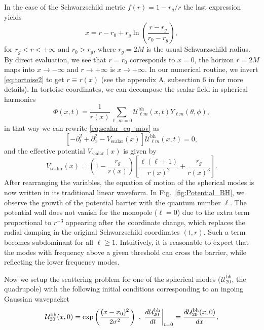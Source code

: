 \documentclass[article,aps,nofootinbib,twocolumn,superscriptaddress]{revtex4-1}
\begin{document}
In the case of the Schwarzschild metric $f(r)=1-r_g/r$ the last expression yields
\begin{equation}
x=r-r_0+r_g\ln\left(\frac{r-r_g}{r_0-r_g}\right),
\label{eq:tortoise2}
\end{equation} 
for $r_g<r<+\infty$ and $r_0>r_g$, where $r_g=2M$ is the usual Schwarzschild radius. By direct evaluation, we see that $r=r_0$ corresponds to $x=0$, the horizon $r=2M$ maps into $x\rightarrow-\infty$ and $r\rightarrow+\infty$ is $x\rightarrow+\infty$. In our numerical routine, we invert \eqref{eq:tortoise2} to get $r\equiv r(x)$ (see the appendix A, subsection 6 in \citep{Frolov:2017asg} for more details). In tortoise coordinates, we can decompose the scalar field in spherical harmonics 
\begin{equation}
\Phi(x,t)=\frac{1}{r(x)}\sum_{\ell,m=0}\mathcal{U}^{\mathrm{bh}}_{\ell m}(x,t)Y_{\ell m}(\theta,\phi),
\label{eq:ylm_decomp}
\end{equation}
in that way we can rewrite \eqref{eq:scalar_eq_mov} as
\begin{equation}
\left[-\partial_t^2+\partial_x^2-V_{\mathrm{scalar}}(x)\right]\mathcal{U}^{\mathrm{bh}}_{\ell m}(x,t) = 0,
\label{eq:wave_scalar}
\end{equation}
and the effective potential $V_{\mathrm{scalar}}(x)$ is given by
\begin{equation}
V_{\mathrm{scalar}}(x) = \left(1-\frac{r_g}{r(x)}\right)\left[\frac{\ell(\ell+1)}{r(x)^2}+\frac{r_g}{r(x)^3}\right].
\end{equation}
After rearranging the variables, the equation of motion of the spherical modes is now written in its traditional linear waveform. In Fig.~\ref{fig:Potential_BH}, we observe the growth of the potential barrier with the quantum number $\ell$. The potential wall does not vanish for the monopole ($\ell=0$) due to the extra term proportional to $r^{-3}$ appearing after the coordinate change, which replaces the radial damping in the original Schwarzschild coordinates $(t,r)$. Such a term becomes subdominant for all $\ell\geq 1$. Intuitively, it is reasonable to expect that the modes with frequency above a given threshold can cross the barrier, while reflecting the lower frequency modes. 

Now we setup the scattering problem for one of the spherical modes ($\mathcal{U}^{\mathrm{bh}}_{20}$, the quadrupole) with the following initial conditions corresponding to an ingoing Gaussian wavepacket 
\begin{equation}
\mathcal{U}^{\mathrm{bh}}_{20}(x,0)=\exp\left(\frac{(x-x_0)^2}{2\sigma^2}\right)~,~\frac{d \mathcal{U}^{\mathrm{bh}}_{20}}{dt}\bigg{|}_{t=0}=\frac{d \mathcal{U}^{\mathrm{bh}}_{20}(x,0)}{dx},
\label{eq:scalar_init_cond}
\end{equation}
\end{document}

